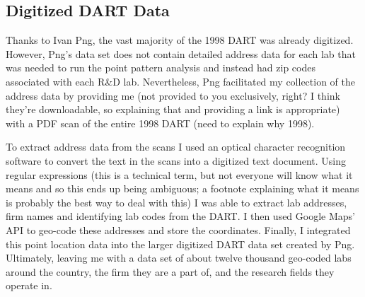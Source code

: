\documentclass[12pt,letterpaper]{article}
\begin{document}
\subsection{Digitized DART Data}
Thanks to Ivan Png, the vast majority of the 1998 DART was already digitized. However, Png's data set does not contain detailed address data for each lab that was needed to run the point pattern analysis and instead had zip codes associated with each R\&D lab. Nevertheless, Png facilitated my collection of the address data by providing me {\color{red}(not provided to you exclusively, right? I think they're downloadable, so explaining that and providing a link is appropriate)} with a PDF scan of the entire 1998 DART {\color{red}(need to explain why 1998)}. 
\par 
To extract address data from the scans I used an optical character recognition software to convert the text in the scans into a digitized text document. Using regular expressions {\color{red}(this is a technical term, but not everyone will know what it means and so this ends up being ambiguous; a footnote explaining what it means is probably the best way to deal with this)} I was able to extract lab addresses, firm names and identifying lab codes from the DART. I then used Google Maps' API to geo-code these addresses and store the coordinates. Finally, I integrated this point location data into the larger digitized DART data set created by Png. Ultimately, leaving me with a data set of about twelve thousand geo-coded labs around the country, the firm they are a part of, and the research fields they operate in. 
\end{document}
